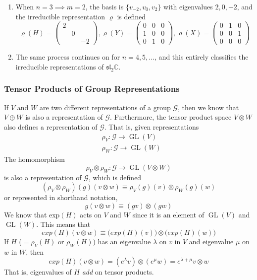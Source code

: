 \documentclass{article}
\DeclareMathOperator{\GL}{GL}
\begin{document}
\begin{enumerate}
      \item When $n=3 \implies m=2$, the basis is $\{v_{-2}, v_0, v_2\}$ with eigenvalues $2, 0, -2$, and the irreducible representation $\varrho$ is defined
        \[\varrho(H) = \begin{pmatrix}
        2&&\\&0&\\&&-2
        \end{pmatrix}, \varrho(Y) = \begin{pmatrix}
        0&0&0\\1&0&0\\0&1&0
        \end{pmatrix}, \varrho(X) = \begin{pmatrix}
        0&1&0\\0&0&1\\0&0&0
        \end{pmatrix}\]
      \item The same process continues on for $n=4, 5, ...$, and this entirely classifies the irreducible representations of $\mathfrak{sl}_2 \mathbb{C}$. 
    \end{enumerate}

    \subsubsection{Tensor Products of Group Representations}

      \begin{definition}
      If $V$ and $W$ are two different representations of a group $\mathcal{G}$, then we know that $V \oplus W$ is also a representation of $\mathcal{G}$. Furthermore, the tensor product space $V \otimes W$ also defines a representation of $\mathcal{G}$. That is, given representations
      \begin{align*}
          & \rho_V: \mathcal{G} \longrightarrow \GL(V) \\
          & \rho_W: \mathcal{G} \longrightarrow \GL(W)
      \end{align*}
      The homomorphism 
      \[\rho_V \otimes \rho_W: \mathcal{G} \longrightarrow \GL(V \otimes W)\]
      is also a representation of $\mathcal{G}$, which is defined
      \[(\rho_V \otimes \rho_W)(g) (v \otimes w) \equiv \rho_V (g) (v) \otimes \rho_W (g) (w)\]
      or represented in shorthand notation, 
      \[g(v \otimes w) \equiv (g v) \otimes (g w)\]
      We know that exp$(H)$ acts on $V$ and $W$ since it is an element of $\GL(V)$ and $\GL(W)$. This means that
      \[exp(H)(v \otimes w) \equiv \big( exp(H)(v)\big) \otimes \big( exp(H)(w)\big)\]
      If $H$ ($= \rho_V (H)$ or $\rho_W(H)$) has an eigenvalue $\lambda$ on $v$ in $V$ and eigenvalue $\mu$ on $w$ in $W$, then 
      \[exp(H) (v \otimes w) = (e^\lambda v) \otimes (e^\mu w) = e^{\lambda + \mu} v \otimes w\]
      That is, eigenvalues of $H$ \textit{add} on tensor products. 
      \end{definition}
\end{document}
